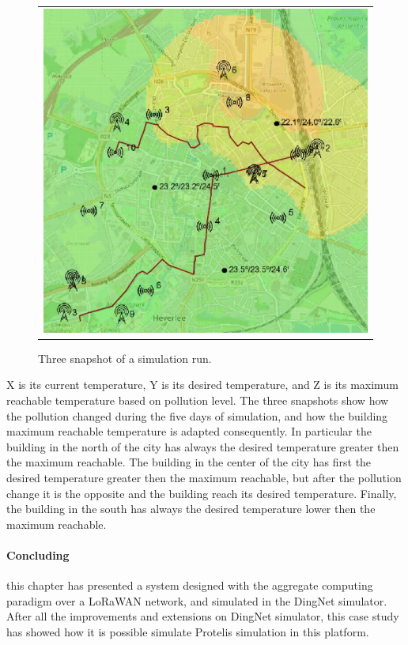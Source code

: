 \begin{figure}[h]
\begin{tabular}{ll}
    \end{tabular}
    \begin{tabular}{c}
         \includegraphics[scale=0.42]{figures/simACsnap3s.png} 
    \end{tabular}
    \caption{Three snapshot of a simulation run.}
    \label{fig:simAC}
\end{figure}
% 
X is its current temperature, Y is its desired temperature, and Z is its maximum reachable temperature based on pollution level.
The three snapshots show how the pollution changed during the five days of simulation, and how the building maximum reachable temperature is adapted consequently.
In particular the building in the north of the city has always the desired temperature greater then the maximum reachable. 
The building in the center of the city has first the desired temperature greater then the maximum reachable, but after the pollution change it is the opposite and the building reach its desired temperature.
Finally, the building in the south has always the desired temperature lower then the maximum reachable.

\paragraph{Concluding} this chapter has presented a system designed with the aggregate computing paradigm over a LoRaWAN network, and simulated in the DingNet simulator.
After all the improvements and extensions on DingNet simulator, this case study has showed how it is possible simulate Protelis simulation in this platform. 
